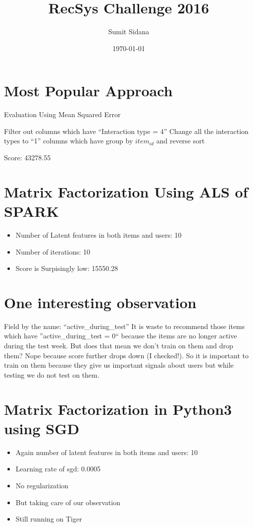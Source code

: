 \documentclass{article}
\begin{document}
\title{RecSys Challenge 2016}
\author{Sumit Sidana}
\date{\today}
\maketitle
\section{Most Popular Approach}

\begin{algorithm}
\caption{Evaluation Using Mean Squared Error}
\begin{algorithmic}[1] 
\State Filter out columns which have ``Interaction type = 4''
\State Change all the interaction types to ``1'' columns which have
\State group by $item_{id}$ and reverse sort
\end{algorithmic}
\end{algorithm}
Score: 43278.55

\section{Matrix Factorization Using ALS of SPARK}
\begin{itemize}
 \item Number of Latent features in both items and users: 10
 \item Number of iterations: 10
 \item Score is Surpisingly low:  15550.28
\end{itemize}

\section{One interesting observation}
Field by the name: ``active\_during\_test''
It is waste to recommend those items which have ''active\_during\_test = 0`` because the items are no longer active during the test week. But does that mean we don't train on them and drop 
them? Nope because score further drops down (I checked!). So it is important to train on them because they give us important signals about users but while testing we do not test on them.


\section{Matrix Factorization in Python3 using SGD}
\begin{itemize}
\item Again number of latent features in both items and users: 10
\item Learning rate of sgd: 0.0005
\item No regularization
\item But taking care of our observation
 \item Still running on Tiger
\end{itemize}
\end{document}
